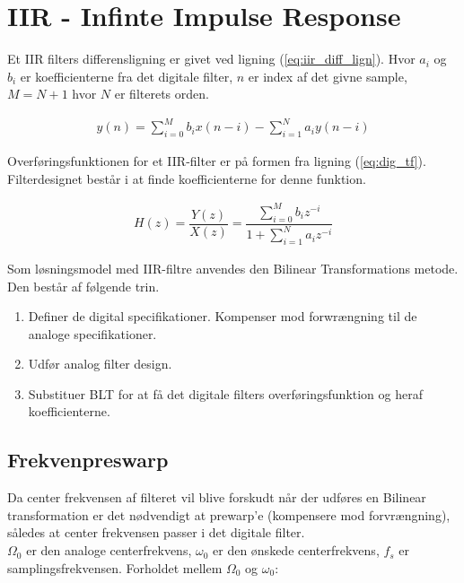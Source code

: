 \section{IIR - Infinte Impulse Response}\label{sec:iir} 

Et IIR filters differensligning er givet ved ligning (\ref{eq:iir_diff_lign}).
Hvor $a_i$ og $b_i$ er koefficienterne fra det digitale filter, $n$ er index af det givne sample,
$M =N + 1$ hvor $N$ er filterets orden.

\begin{align}
y(n) = \sum\limits_{i=0}^{M} b_i x(n-i) - \sum\limits_{i=1}^{N} a_i y(n-i) 
\label{eq:iir_diff_lign}
\end{align}


    Overføringsfunktionen for et IIR-filter er på formen fra ligning (\ref{eq:dig_tf}). Filterdesignet består  
    i at finde koefficienterne for denne funktion.
    
    \begin{align}
        H(z) = \dfrac{Y(z)}{X(z)} = \dfrac{\sum\limits_{i=0}^M b_i z^{-i}}{1 + \sum\limits_{i=1}^N a_i z^{-i}}
        \label{eq:dig_tf}
    \end{align}


Som løsningsmodel med IIR-filtre anvendes den Bilinear Transformations metode. Den 
består af følgende trin. 
    \begin{enumerate}
        \item Definer de digital specifikationer. Kompenser mod forwrængning til de analoge specifikationer.
        \item Udfør analog filter design.
        \item Substituer BLT for at få det digitale filters overføringsfunktion og heraf koefficienterne. 
    \end{enumerate}



    \subsection{Frekvenpreswarp}
    Da center frekvensen af filteret vil blive forskudt når der udføres en Bilinear
    transformation er det nødvendigt at prewarp'e (kompensere mod forvrængning), således at center frekvensen passer i det digitale filter.\\
    $\Omega_0$ er den analoge centerfrekvens, $\omega_0$ er den ønskede centerfrekvens, $f_s$ er samplingsfrekvensen. 
    Forholdet mellem $\Omega_0$ og $\omega_0$:
  
